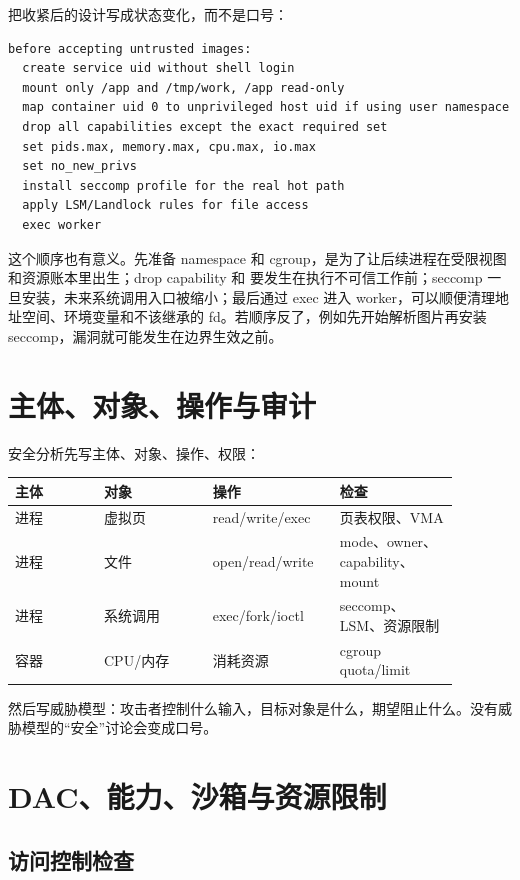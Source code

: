 把收紧后的设计写成状态变化，而不是口号：

\begin{lstlisting}
before accepting untrusted images:
  create service uid without shell login
  mount only /app and /tmp/work, /app read-only
  map container uid 0 to unprivileged host uid if using user namespace
  drop all capabilities except the exact required set
  set pids.max, memory.max, cpu.max, io.max
  set no_new_privs
  install seccomp profile for the real hot path
  apply LSM/Landlock rules for file access
  exec worker
\end{lstlisting}

这个顺序也有意义。先准备 namespace 和 cgroup，是为了让后续进程在受限视图和资源账本里出生；drop capability 和  要发生在执行不可信工作前；seccomp 一旦安装，未来系统调用入口被缩小；最后通过 exec 进入 worker，可以顺便清理地址空间、环境变量和不该继承的 fd。若顺序反了，例如先开始解析图片再安装 seccomp，漏洞就可能发生在边界生效之前。

\section{主体、对象、操作与审计}

安全分析先写主体、对象、操作、权限：

\begin{longtable}{p{0.18\linewidth}p{0.22\linewidth}p{0.24\linewidth}p{0.24\linewidth}}
\toprule
主体 & 对象 & 操作 & 检查 \\
\midrule
进程 & 虚拟页 & read/write/exec & 页表权限、VMA \\
进程 & 文件 & open/read/write & mode、owner、capability、mount \\
进程 & 系统调用 & exec/fork/ioctl & seccomp、LSM、资源限制 \\
容器 & CPU/内存 & 消耗资源 & cgroup quota/limit \\
\bottomrule
\end{longtable}

然后写威胁模型：攻击者控制什么输入，目标对象是什么，期望阻止什么。没有威胁模型的“安全”讨论会变成口号。

\section{DAC、能力、沙箱与资源限制}

\subsection{访问控制检查}

